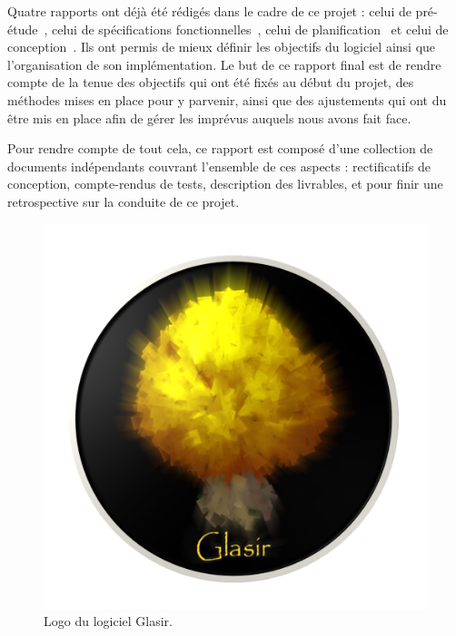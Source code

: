 Quatre rapports ont déjà été rédigés dans le cadre de ce projet : celui de pré-étude~\cite{pre_etude}, celui de spécifications fonctionnelles~\cite{spec_fonc}, celui de planification~\cite{planif} et celui de conception~\cite{conception}. Ils ont permis de mieux définir les objectifs du logiciel ainsi que l'organisation de son implémentation. Le but de ce rapport final est de rendre compte de la tenue des objectifs qui ont été fixés au début du projet, des méthodes mises en place pour y parvenir, ainsi que des ajustements qui ont du être mis en place afin de gérer les imprévus auquels nous avons fait face. 

Pour rendre compte de tout cela, ce rapport est composé d'une collection de documents indépendants couvrant l'ensemble de ces aspects : rectificatifs de conception, compte-rendus de tests, description des livrables, et pour finir une retrospective sur la conduite de ce projet.

    \begin{figure}[!h]
        \centering
        \includegraphics[height=0.5\textwidth]{figure/glasir.png}
        \caption{Logo du logiciel Glasir.}
        \label{fig:glasir}
    \end{figure}